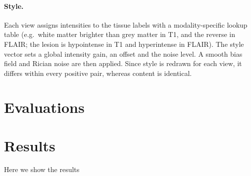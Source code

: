 \documentclass{article}
\begin{document}
\paragraph{Style.}
Each view assigns intensities to the tissue labels with a modality-specific
lookup table (e.g.\ white matter brighter than grey matter in T1, and the
reverse in FLAIR; the lesion is hypointense in T1 and hyperintense in FLAIR).
The style vector sets a global intensity gain, an offset and the noise level.
A smooth bias field and Rician noise are then applied. Since style is redrawn
for each view, it differs within every positive pair, whereas content is
identical.

\section{Evaluations}

\section{Results}
Here we show the results






\end{document}

